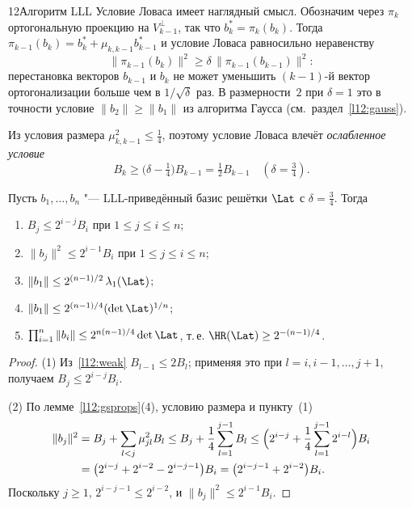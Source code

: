 \begin{lecture}{12}{Алгоритм LLL}
Условие Ловаса имеет наглядный смысл. Обозначим через $\pi_k$ ортогональную проекцию на
$V_{k-1}^\perp$, так что $b_k^* = \pi_k(b_k)$. Тогда $\pi_{k-1}(b_k) = b_k^* +
\mu_{k,k-1} b_{k-1}^*$ и условие Ловаса равносильно неравенству
\[
  \|\pi_{k-1}(b_k)\|^2 \ge \delta\, \|\pi_{k-1}(b_{k-1})\|^2 :
\]
перестановка векторов $b_{k-1}$ и $b_k$ не может уменьшить $(k-1)$-й вектор ортогонализации
больше чем в $1/\sqrt{\delta}$ раз. В размерности~$2$ при $\delta = 1$ это в точности условие
$\|b_2\| \ge \|b_1\|$ из алгоритма Гаусса (см.~раздел~\ref{l12:gauss}).

Из условия размера $\mu_{k,k-1}^2 \le \frac14$, поэтому условие Ловаса влечёт
\emph{ослабленное условие}
\begin{equation}\label{l12:weak}
  B_k \ge \bigl(\delta - \tfrac14\bigr) B_{k-1} = \tfrac12 B_{k-1} \quad (\delta = \tfrac34).
\end{equation}

\begin{theorem}\label{l12:props}
Пусть $b_1, \dots, b_n$ "--- LLL-приведённый базис решётки $\Lat$ с $\delta = \frac34$. Тогда
\begin{enumerate}
  \item $B_j \le 2^{i-j} B_i$ при $1 \le j \le i \le n$;
  \item $\|b_j\|^2 \le 2^{i-1} B_i$ при $1 \le j \le i \le n$;
  \item $\|b_1\| \le 2^{(n-1)/2}\, \lambda_1(\Lat)$;
  \item $\|b_1\| \le 2^{(n-1)/4} (\det \Lat)^{1/n}$;
  \item $\prod_{i=1}^n \|b_i\| \le 2^{n(n-1)/4} \det \Lat$, т.\,е. $\HR(\Lat) \ge 2^{-(n-1)/4}$.
\end{enumerate}
\end{theorem}

\begin{proof}
(1) Из~\eqref{l12:weak} $B_{l-1} \le 2 B_l$; применяя это при $l = i, i-1, \dots, j+1$,
получаем $B_j \le 2^{i-j} B_i$.

(2) По лемме~\ref{l12:gsprops}(4), условию размера и пункту~(1)
\[
\begin{aligned}
  \|b_j\|^2 &= B_j + \sum_{l<j} \mu_{jl}^2 B_l \le B_j + \frac14 \sum_{l=1}^{j-1} B_l
  \le \Bigl(2^{i-j} + \frac14 \sum_{l=1}^{j-1} 2^{i-l}\Bigr) B_i\\
  &= \bigl(2^{i-j} + 2^{i-2} - 2^{i-j-1}\bigr) B_i = \bigl(2^{i-j-1} + 2^{i-2}\bigr) B_i.
\end{aligned}
\]
Поскольку $j \ge 1$, $2^{i-j-1} \le 2^{i-2}$, и $\|b_j\|^2 \le 2^{i-1} B_i$.


\end{proof}
\end{lecture}
